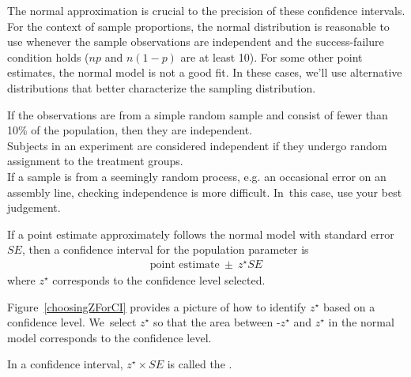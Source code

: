 The normal approximation is crucial to the precision of these
confidence intervals. For the context of sample proportions, the
normal distribution is reasonable to use whenever the sample
observations are independent and the success-failure condition
holds ($np$ and $n(1-p)$ are at least 10).
For some other point estimates, the normal model is not a good fit.
In these cases, we'll use alternative distributions that better
characterize the sampling distribution.

\begin{tipBox}{
  If the observations are from a simple random sample and consist
      of fewer than 10\% of the population, then they are independent.\\[2mm]
  Subjects in an experiment are considered independent if they undergo
      random assignment to the treatment groups. \\[2mm]
  If a sample is from a seemingly random process,
      e.g. an occasional error on an assembly line,
      checking independence is more difficult. In~this case,
      use your best judgement.}
\end{tipBox}

\begin{termBox}{
  If a point estimate approximately follows the normal model with
  standard error $SE$, then a confidence interval for the population
  parameter is
  \begin{eqnarray*}
  \text{point estimate}\ \pm\ z^{\star} SE
  \end{eqnarray*}
  where $z^{\star}$ corresponds to the confidence level selected.}
\end{termBox}

Figure~\ref{choosingZForCI} provides a picture of how to identify
$z^{\star}$ based on a confidence level. We~select $z^{\star}$
so that the area between -$z^{\star}$ and $z^{\star}$ in the normal
model corresponds to the confidence level. 

\begin{termBox}{
\label{marginOfErrorTermBox}
In a confidence interval, $z^{\star}\times SE$ is called the
.}
\end{termBox}


